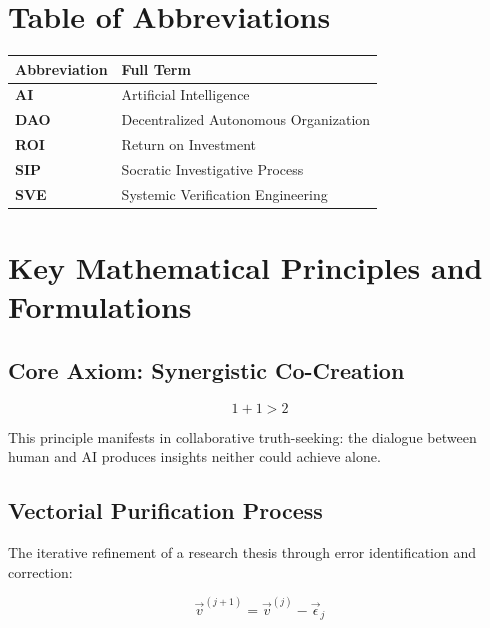 \documentclass[11pt,a4paper]{article}
\begin{document}
\begin{small}
\section*{Table of Abbreviations}

\begin{tabular}{@{}>{\bfseries}ll@{}}
\toprule
\normalfont\textbf{Abbreviation} & \textbf{Full Term} \\
\midrule
AI & Artificial Intelligence \\
DAO & Decentralized Autonomous Organization \\
ROI & Return on Investment \\
SIP & Socratic Investigative Process \\
SVE & Systemic Verification Engineering \\
\bottomrule
\end{tabular}

\vspace{1cm}

\section*{Key Mathematical Principles and Formulations}

\subsection*{Core Axiom: Synergistic Co-Creation}
\begin{equation}
1 + 1 > 2
\label{eq:synergy}
\end{equation}

\noindent This principle manifests in collaborative truth-seeking: the dialogue between human and AI produces insights neither could achieve alone.

\subsection*{Vectorial Purification Process}
The iterative refinement of a research thesis through error identification and correction:

\begin{equation}
\vec{v}^{(j+1)} = \vec{v}^{(j)} - \vec{\epsilon}_j
\label{eq:purification}
\end{equation}


\end{small}
\end{document}

